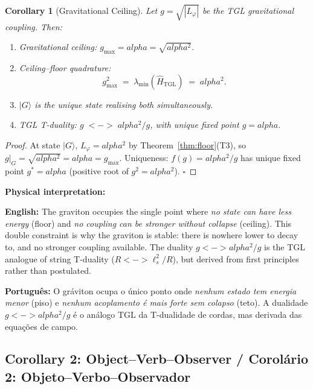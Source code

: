 \documentclass[12pt,a4paper]{article}
\newtheorem{corollary}{Corollary}
\def\leftrightarrow{ <-> }%
\def\alpha{alpha}%
\begin{document}
\begin{corollary}[Gravitational Ceiling]
\label{cor:ceiling}
Let $g = \sqrt{|L_\varphi|}$ be the TGL gravitational coupling. Then:
\begin{enumerate}
    \item[\textbf{(i)}] Gravitational ceiling: $g_{\max} = \alpha = \sqrt{\alpha^2}$.
    \item[\textbf{(ii)}] Ceiling--floor quadrature:
    \begin{equation}
        \boxed{g_{\max}^2 \;=\; \lambda_{\min}(\hat{H}_{\text{TGL}}) \;=\; \alpha^2.}
    \end{equation}
    \item[\textbf{(iii)}] $|G\rangle$ is the unique state realising both simultaneously.
    \item[\textbf{(iv)}] TGL T-duality: $g \;\leftrightarrow\; \alpha^2/g$, with unique fixed point $g = \alpha$.
\end{enumerate}
\end{corollary}

\begin{proof}
At state $|G\rangle$, $L_\varphi = \alpha^2$ by Theorem~\ref{thm:floor}(T3), so $g|_G = \sqrt{\alpha^2} = \alpha = g_{\max}$.
Uniqueness: $f(g) = \alpha^2/g$ has unique fixed point $g^* = \alpha$ (positive root of $g^2 = \alpha^2$). $\square$
\end{proof}

\textbf{Physical interpretation:}

\textbf{English:} The graviton occupies the single point where \emph{no state can have less energy} (floor) and \emph{no coupling can be stronger without collapse} (ceiling). This double constraint is why the graviton is stable: there is nowhere lower to decay to, and no stronger coupling available. The duality $g \leftrightarrow \alpha^2/g$ is the TGL analogue of string T-duality ($R \leftrightarrow \ell_s^2/R$), but derived from first principles rather than postulated.

\textbf{Português:} O gráviton ocupa o único ponto onde \emph{nenhum estado tem energia menor} (piso) e \emph{nenhum acoplamento é mais forte sem colapso} (teto). A dualidade $g \leftrightarrow \alpha^2/g$ é o análogo TGL da T-dualidade de cordas, mas derivada das equações de campo.

\subsection{Corollary 2: Object--Verb--Observer / Corolário 2: Objeto--Verbo--Observador}
\end{document}

